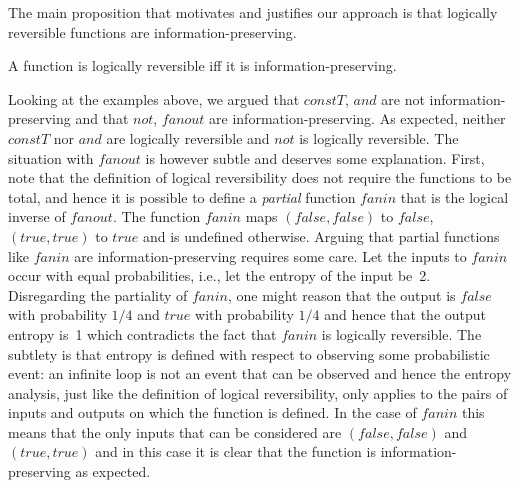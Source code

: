 \noindent The main proposition that motivates and justifies our approach is that
logically reversible functions are information-preserving.

\begin{proposition}
A function is logically reversible iff it is information-preserving.
\end{proposition}

Looking at the examples above, we argued that \ensuremath{\mathit{constT}}, \ensuremath{\mathit{and}} are
not information-preserving and that \ensuremath{\mathit{not}}, \ensuremath{\mathit{fanout}} are
information-preserving. As expected, neither \ensuremath{\mathit{constT}} nor \ensuremath{\mathit{and}}
are logically reversible and \ensuremath{\mathit{not}} is logically reversible. The
situation with \ensuremath{\mathit{fanout}} is however subtle and deserves some
explanation. First, note that the definition of logical reversibility
does not require the functions to be total, and hence it is possible
to define a \emph{partial} function \ensuremath{\mathit{fanin}} that is the logical
inverse of \ensuremath{\mathit{fanout}}. The function \ensuremath{\mathit{fanin}} maps \ensuremath{(\mathit{false},\mathit{false})}
to \ensuremath{\mathit{false}}, \ensuremath{(\mathit{true},\mathit{true})} to \ensuremath{\mathit{true}} and is undefined
otherwise. Arguing that partial functions like \ensuremath{\mathit{fanin}} are
information-preserving requires some care. Let the inputs to \ensuremath{\mathit{fanin}}
occur with equal probabilities, i.e., let the entropy of the input
be~2. Disregarding the partiality of \ensuremath{\mathit{fanin}}, one might reason that
the output is \ensuremath{\mathit{false}} with probability $1/4$ and \ensuremath{\mathit{true}} with
probability $1/4$ and hence that the output entropy is~1 which
contradicts the fact that \ensuremath{\mathit{fanin}} is logically reversible. The
subtlety is that entropy is defined with respect to observing some
probabilistic event: an infinite loop is not an event that can be
observed and hence the entropy analysis, just like the definition of
logical reversibility, only applies to the pairs of inputs and outputs
on which the function is defined. In the case of \ensuremath{\mathit{fanin}} this means
that the only inputs that can be considered are \ensuremath{(\mathit{false},\mathit{false})} and
\ensuremath{(\mathit{true},\mathit{true})} and in this case it is clear that the function is
information-preserving as expected.


